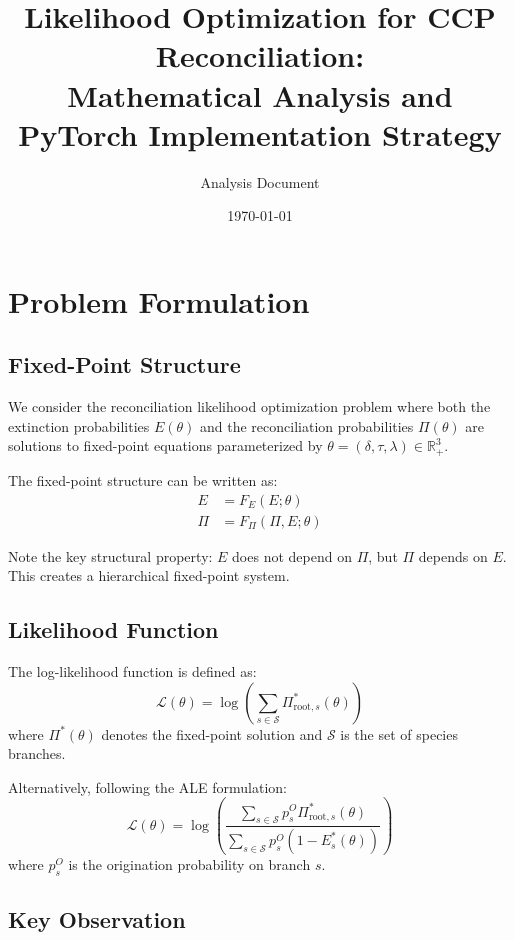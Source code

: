 \documentclass[11pt]{article}
\title{Likelihood Optimization for CCP Reconciliation:\\Mathematical Analysis and PyTorch Implementation Strategy}
\author{Analysis Document}
\date{\today}
\theoremstyle{definition}
\begin{document}
\maketitle

\section{Problem Formulation}

\subsection{Fixed-Point Structure}

We consider the reconciliation likelihood optimization problem where both the extinction probabilities $E(\theta)$ and the reconciliation probabilities $\Pi(\theta)$ are solutions to fixed-point equations parameterized by $\theta = (\delta, \tau, \lambda) \in \mathbb{R}^3_+$.

The fixed-point structure can be written as:
\begin{align}
    E &= F_E(E; \theta) \\
    \Pi &= F_\Pi(\Pi, E; \theta)
\end{align}

Note the key structural property: $E$ does not depend on $\Pi$, but $\Pi$ depends on $E$. This creates a hierarchical fixed-point system.

\subsection{Likelihood Function}

The log-likelihood function is defined as:
\begin{equation}
    \mathcal{L}(\theta) = \log\left(\sum_{s \in \mathcal{S}} \Pi^*_{\text{root},s}(\theta)\right)
\end{equation}
where $\Pi^*(\theta)$ denotes the fixed-point solution and $\mathcal{S}$ is the set of species branches.

Alternatively, following the ALE formulation:
\begin{equation}
    \mathcal{L}(\theta) = \log\left(\frac{\sum_{s \in \mathcal{S}} p_s^O \Pi^*_{\text{root},s}(\theta)}{\sum_{s \in \mathcal{S}} p_s^O (1 - E^*_s(\theta))}\right)
\end{equation}
where $p_s^O$ is the origination probability on branch $s$.

\subsection{Key Observation}
\end{document}
